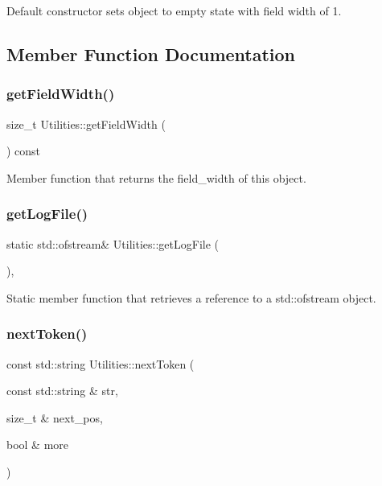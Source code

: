 Default constructor sets object to empty state with field width of 1. 

\subsection{Member Function Documentation}
\mbox{\label{classUtilities_a94abc3ceade71097979e76e15008efba}} 
\subsubsection{\texorpdfstring{get\+Field\+Width()}{getFieldWidth()}}
{\footnotesize\ttfamily size\+\_\+t Utilities\+::get\+Field\+Width (\begin{DoxyParamCaption}{ }\end{DoxyParamCaption}) const\hspace{0.3cm}{\ttfamily [inline]}}

Member function that returns the field\+\_\+width of this object. \mbox{\label{classUtilities_aecd7de50b27a709a9810b17940074cad}} 
\subsubsection{\texorpdfstring{get\+Log\+File()}{getLogFile()}}
{\footnotesize\ttfamily static std\+::ofstream\& Utilities\+::get\+Log\+File (\begin{DoxyParamCaption}{ }\end{DoxyParamCaption})\hspace{0.3cm}{\ttfamily [inline]}, {\ttfamily [static]}}

Static member function that retrieves a reference to a std\+::ofstream object. \mbox{\label{classUtilities_a59c27deae1e3810d8591b35ed90b7f33}} 
\subsubsection{\texorpdfstring{next\+Token()}{nextToken()}}
{\footnotesize\ttfamily const std\+::string Utilities\+::next\+Token (\begin{DoxyParamCaption}\item[{const std\+::string \&}]{str,  }\item[{size\+\_\+t \&}]{next\+\_\+pos,  }\item[{bool \&}]{more }\end{DoxyParamCaption})}

